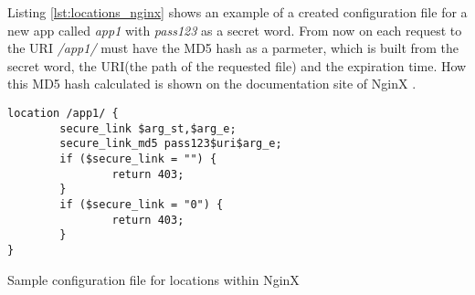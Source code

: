 Listing \ref{lst:locations_nginx} shows an example of a created configuration file for a new app called \textit{app1} with \textit{pass123} as a secret word. From now on each request to the URI \textit{/app1/} must have the MD5 hash as a parmeter, which is built from the secret word, the URI(the path of the requested file) and the expiration time. How this MD5 hash calculated is shown on the documentation site of NginX \cite{nginx:securelink}.

\begin{code}
\begin{verbatim}
location /app1/ {
        secure_link $arg_st,$arg_e;
        secure_link_md5 pass123$uri$arg_e;
        if ($secure_link = "") {
                return 403;
        }
        if ($secure_link = "0") {
                return 403;
        }
}
\end{verbatim}
\caption{Sample configuration file for locations within NginX}
\label{lst:locations_nginx}
\end{code}


	
	
	


